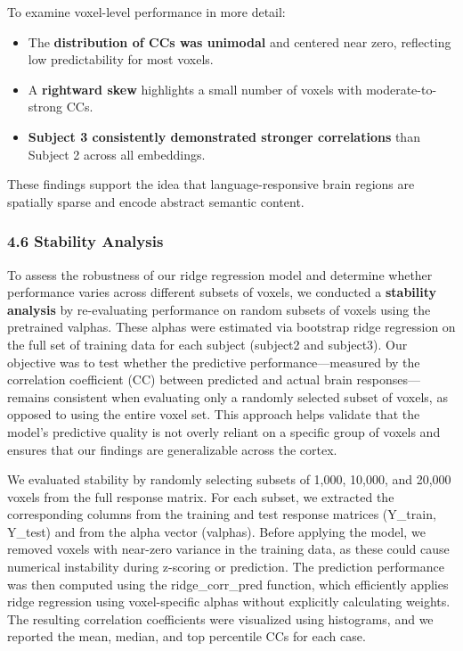 \documentclass[11pt]{article}
\begin{document}
To examine voxel-level performance in more detail:

\begin{itemize}
\item
  The \textbf{distribution of CCs was unimodal} and centered near zero,
  reflecting low predictability for most voxels.
\item
  A \textbf{rightward skew} highlights a small number of voxels with
  moderate-to-strong CCs.
\item
  \textbf{Subject 3 consistently demonstrated stronger correlations}
  than Subject 2 across all embeddings.
\end{itemize}

These findings support the idea that language-responsive brain regions
are spatially sparse and encode abstract semantic content.

\hypertarget{stability-analysis}{%
\subsubsection{4.6 Stability Analysis}\label{stability-analysis}}

To assess the robustness of our ridge regression model and determine
whether performance varies across different subsets of voxels, we
conducted a \textbf{stability analysis} by re-evaluating performance on
random subsets of voxels using the pretrained valphas. These alphas were
estimated via bootstrap ridge regression on the full set of training
data for each subject (subject2 and subject3). Our objective was to test
whether the predictive performance---measured by the correlation
coefficient (CC) between predicted and actual brain responses---remains
consistent when evaluating only a randomly selected subset of voxels, as
opposed to using the entire voxel set. This approach helps validate that
the model's predictive quality is not overly reliant on a specific group
of voxels and ensures that our findings are generalizable across the
cortex.

We evaluated stability by randomly selecting subsets of 1,000, 10,000,
and 20,000 voxels from the full response matrix. For each subset, we
extracted the corresponding columns from the training and test response
matrices (Y\_train, Y\_test) and from the alpha vector (valphas). Before
applying the model, we removed voxels with near-zero variance in the
training data, as these could cause numerical instability during
z-scoring or prediction. The prediction performance was then computed
using the ridge\_corr\_pred function, which efficiently applies ridge
regression using voxel-specific alphas without explicitly calculating
weights. The resulting correlation coefficients were visualized using
histograms, and we reported the mean, median, and top percentile CCs for
each case.
\end{document}
